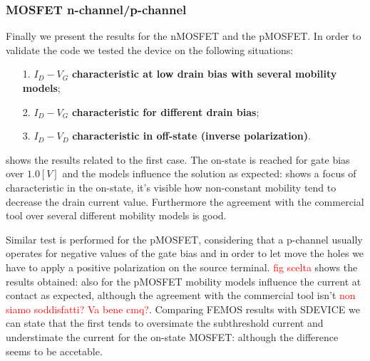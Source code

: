 %
%



\clearpage

\subsubsection{MOSFET n-channel/p-channel}

Finally we present the results for the nMOSFET and the pMOSFET. In order to validate the code we tested the device on the following situations:

\begin{itemize}
\item[1.] $I_D-V_G$ {\bf characteristic at low drain bias with several mobility models};
\item[2.] $I_D-V_G$ {\bf characteristic for different drain bias};
\item[3.] $I_D-V_D$ {\bf characteristic in off-state (inverse polarization)}.
\end{itemize}

 shows the results related to the first case. The on-state is reached for gate bias over $1.0[V]$ and the models influence the solution as expected:  shows a focus of characteristic in the on-state, it's visible how non-constant mobility tend to decrease the drain current value. Furthermore the agreement with the commercial tool over several different mobility models is good.  

Similar test is performed for the pMOSFET, considering that a p-channel usually operates for negative values of the gate bias and in order to let move the holes we have to apply a positive polarization on the source terminal. \textcolor{red}{fig scelta} shows the results obtained: also for the pMOSFET mobility models influence the current at contact as expected, although the agreement with the commercial tool isn't \textcolor{red}{non siamo soddisfatti? Va bene cmq?}.
Comparing FEMOS results with SDEVICE we can state that the first tends to oversimate the subthreshold current and understimate the current for the on-state MOSFET: although the difference seems to be  accetable.


